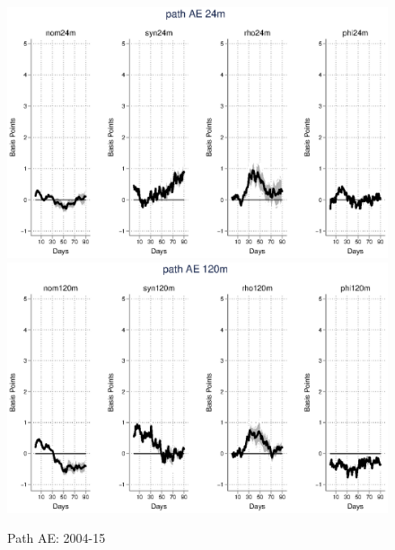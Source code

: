 \documentclass{article}
\begin{document}
\begin{figure}[tbph]
	\begin{center}
		\caption{Path AE: 2004-15}
		\includegraphics[trim={0cm 0cm 0cm 0cm},clip,height=0.5\textheight,width=1\textwidth]{../LagDep-FX/Path/AE/PathAE24m.eps} \\
		\includegraphics[trim={0cm 0cm 0cm 0cm},clip,height=0.5\textheight,width=1\textwidth]{../LagDep-FX/Path/AE/PathAE120m.eps} \\
	\end{center}
\end{figure}

\pagebreak[4]
\end{document}
